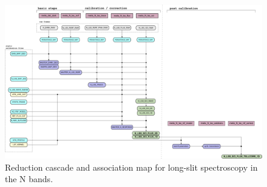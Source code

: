 \begin{figure}
  \centering
  \includegraphics[width=0.9\textheight]{figures/N_LSS_pipeline_wf_draft_latest_v0.74.png}
  \caption[Reduction cascade and association map for N long-slit
  spectroscopy]{Reduction cascade and association map for long-slit
    spectroscopy in the N bands. }
  \label{Fig:NLssAssomap}
\end{figure}

